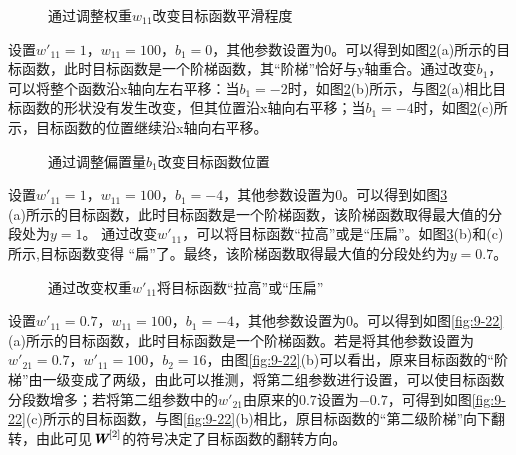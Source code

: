 \begin{figure}[htp]
\centering

\caption{通过调整权重$ w_{11} $改变目标函数平滑程度}
\label{fig:9-19}
\end {figure}


\parinterval 设置$ w'_{11}=1 $，$ w_{11}=100 $，$ b_1=0 $，其他参数设置为0。可以得到如图\ref{fig:9-20}(a)所示的目标函数，此时目标函数是一个阶梯函数，其“阶梯”恰好与y轴重合。通过改变$ b_1 $，可以将整个函数沿x轴向左右平移：当$ b_1=-2 $时，如图\ref{fig:9-20}(b)所示，与图\ref{fig:9-20}(a)相比目标函数的形状没有发生改变，但其位置沿x轴向右平移；当$ b_1=-4 $时，如图\ref{fig:9-20}(c)所示，目标函数的位置继续沿x轴向右平移。

\begin{figure}[htp]
\centering

\caption{通过调整偏置量$ b_1 $改变目标函数位置}
\label{fig:9-20}
\end {figure}

\parinterval 设置$ w'_{11}=1 $，$ w_{11}=100 $，$ b_1=-4 $，其他参数设置为0。可以得到如图\ref{fig:9-21}\\(a)所示的目标函数，此时目标函数是一个阶梯函数，该阶梯函数取得最大值的分段处为$ y=1 $。 通过改变$ w'_{11} $，可以将目标函数“拉高”或是“压扁”。如图\ref{fig:9-21}(b)和(c)所示,目标函数变得 “扁”了。最终，该阶梯函数取得最大值的分段处约为$ y=0.7 $。

\begin{figure}[htp]
\centering

\caption{通过改变权重$ w'_{11} $将目标函数“拉高”或“压扁”}
\label{fig:9-21}
\end {figure}

\parinterval 设置$ w'_{11}=0.7 $，$ w_{11}=100 $，$ b_1=-4 $，其他参数设置为0。可以得到如图\ref{fig:9-22}(a)所示的目标函数，此时目标函数是一个阶梯函数。若是将其他参数设置为$ w'_{21}=0.7 $，$ w'_{11}=100 $，$ b_2=16 $，由图\ref{fig:9-22}(b)可以看出，原来目标函数的“阶梯”由一级变成了两级，由此可以推测，将第二组参数进行设置，可以使目标函数分段数增多；若将第二组参数中的$ w'_{21} $由原来的$ 0.7 $设置为$ -0.7 $，可得到如图\ref{fig:9-22}(c)所示的目标函数，与图\ref{fig:9-22}(b)相比，原目标函数的“第二级阶梯”向下翻转，由此可见${\textbf{\em W}}^{[2]}$的符号决定了目标函数的翻转方向。

